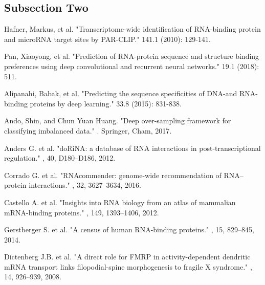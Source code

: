 \documentclass[twoside,twocolumn]{article}
\begin{document}
\subsection{Subsection Two}

\blindtext %


\begin{thebibliography}{99} %

Hafner, Markus, et al. "Transcriptome-wide identification of RNA-binding protein and microRNA target sites by PAR-CLIP."  141.1 (2010): 129-141.

Pan, Xiaoyong, et al. "Prediction of RNA-protein sequence and structure binding preferences using deep convolutional and recurrent neural networks."  19.1 (2018): 511.

Alipanahi, Babak, et al. "Predicting the sequence specificities of DNA-and RNA-binding proteins by deep learning."  33.8 (2015): 831-838.

Ando, Shin, and Chun Yuan Huang. "Deep over-sampling framework for classifying imbalanced data." . Springer, Cham, 2017.

Anders G. et al.  "doRiNA: a database of RNA interactions in post-transcriptional regulation." , 40, D180–D186, 2012.

Corrado G. et al.  "RNAcommender: genome-wide recommendation of RNA–protein interactions." , 32, 3627–3634, 2016.

Castello A. et al. "Insights into RNA biology from an atlas of mammalian mRNA-binding proteins." , 149, 1393–1406, 2012.

Gerstberger S. et al.  "A census of human RNA-binding proteins." , 15, 829–845, 2014.

Dictenberg J.B. et al. "A direct role for FMRP in activity-dependent dendritic mRNA transport links filopodial-spine morphogenesis to fragile X syndrome." , 14, 926–939, 2008.

\end{thebibliography}

\end{document}
